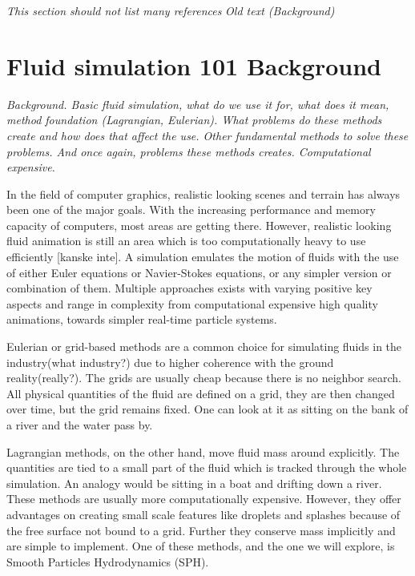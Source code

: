 \documentclass[../../main.tex]{subfiles}
\begin{document}
\textit{This section should not list many references}
\textit{Old text (Background)}
\hspace{1pt}

\section{Fluid simulation 101 Background}
{\color{red}\textit{Background. Basic fluid simulation, what do we use it for, what does it mean, method foundation (Lagrangian, Eulerian). What problems do these methods create and how does that affect the use. Other fundamental methods to solve these problems. And once again, problems these methods creates. Computational expensive. }}

In the field of computer graphics, realistic looking scenes and terrain has always been one of the major goals. With the increasing performance and memory capacity of computers, most areas are getting there. However, realistic looking fluid animation is still an area which is too computationally heavy to use efficiently [kanske inte]. A simulation emulates the motion of fluids with the use of either Euler equations or Navier-Stokes equations, or any simpler version or combination of them. Multiple approaches exists with varying positive key aspects and range in complexity from computational expensive high quality animations, towards simpler real-time particle systems.

Eulerian or grid-based methods are a common choice for simulating fluids in the industry(what industry?) due to higher coherence with the ground reality(really?). The grids are usually cheap because there is no neighbor search. All physical quantities of the fluid are defined on a grid, they are then changed over time, but the grid remains fixed. One can look at it as sitting on the bank of a river and the water pass by. 

Lagrangian methods, on the other hand, move fluid mass around explicitly. The quantities are tied to a small part of the fluid which is tracked through the whole simulation. An analogy would be sitting in a boat and drifting down a river. These methods are usually more computationally expensive. However, they offer advantages on creating small scale features like droplets and splashes because of the free surface not bound to a grid. Further they conserve mass implicitly and are simple to implement. One of these methods, and the one we will explore, is Smooth Particles Hydrodynamics (SPH).
\end{document}
